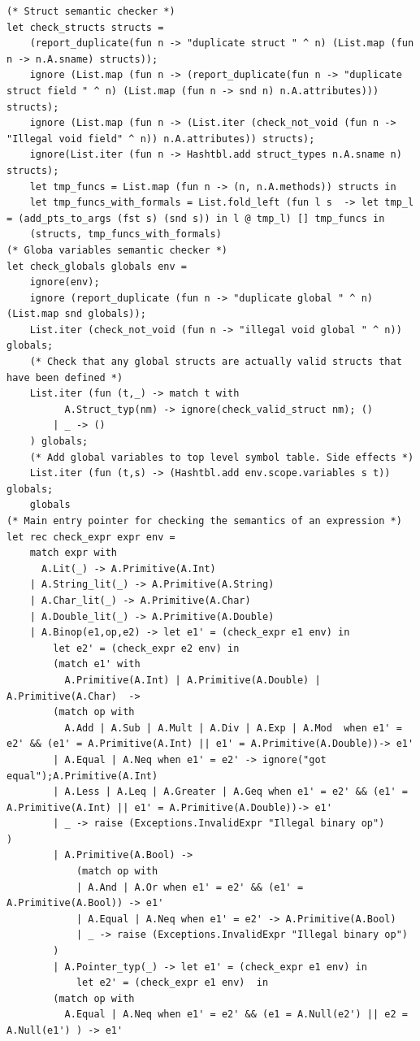 \documentclass{article}
\begin{document}
\begin{lstlisting}
(* Struct semantic checker *)
let check_structs structs = 
	(report_duplicate(fun n -> "duplicate struct " ^ n) (List.map (fun n -> n.A.sname) structs)); 
	ignore (List.map (fun n -> (report_duplicate(fun n -> "duplicate struct field " ^ n) (List.map (fun n -> snd n) n.A.attributes))) structs);
	ignore (List.map (fun n -> (List.iter (check_not_void (fun n -> "Illegal void field" ^ n)) n.A.attributes)) structs);
	ignore(List.iter (fun n -> Hashtbl.add struct_types n.A.sname n) structs);
	let tmp_funcs = List.map (fun n -> (n, n.A.methods)) structs in
	let tmp_funcs_with_formals = List.fold_left (fun l s  -> let tmp_l = (add_pts_to_args (fst s) (snd s)) in l @ tmp_l) [] tmp_funcs in
	(structs, tmp_funcs_with_formals)
(* Globa variables semantic checker *)
let check_globals globals env = 
	ignore(env);
	ignore (report_duplicate (fun n -> "duplicate global " ^ n) (List.map snd globals)); 
	List.iter (check_not_void (fun n -> "illegal void global " ^ n)) globals;
	(* Check that any global structs are actually valid structs that have been defined *)
	List.iter (fun (t,_) -> match t with 
		  A.Struct_typ(nm) -> ignore(check_valid_struct nm); ()
		| _ -> ()
	) globals;
	(* Add global variables to top level symbol table. Side effects *)
	List.iter (fun (t,s) -> (Hashtbl.add env.scope.variables s t)) globals;
	globals
(* Main entry pointer for checking the semantics of an expression *)
let rec check_expr expr env =
	match expr with
	  A.Lit(_) -> A.Primitive(A.Int)
	| A.String_lit(_) -> A.Primitive(A.String)
	| A.Char_lit(_) -> A.Primitive(A.Char)
	| A.Double_lit(_) -> A.Primitive(A.Double)
	| A.Binop(e1,op,e2) -> let e1' = (check_expr e1 env) in 
		let e2' = (check_expr e2 env) in
		(match e1' with 
		  A.Primitive(A.Int) | A.Primitive(A.Double) | A.Primitive(A.Char)  -> 
		(match op with
		  A.Add | A.Sub | A.Mult | A.Div | A.Exp | A.Mod  when e1' = e2' && (e1' = A.Primitive(A.Int) || e1' = A.Primitive(A.Double))-> e1'
		| A.Equal | A.Neq when e1' = e2' -> ignore("got equal");A.Primitive(A.Int)
		| A.Less | A.Leq | A.Greater | A.Geq when e1' = e2' && (e1' = A.Primitive(A.Int) || e1' = A.Primitive(A.Double))-> e1'
		| _ -> raise (Exceptions.InvalidExpr "Illegal binary op") 
) 
		| A.Primitive(A.Bool) -> 		
			(match op with
			| A.And | A.Or when e1' = e2' && (e1' = A.Primitive(A.Bool)) -> e1'
			| A.Equal | A.Neq when e1' = e2' -> A.Primitive(A.Bool)
			| _ -> raise (Exceptions.InvalidExpr "Illegal binary op") 
		) 
		| A.Pointer_typ(_) -> let e1' = (check_expr e1 env) in 
			let e2' = (check_expr e1 env)  in  
		(match op with
		  A.Equal | A.Neq when e1' = e2' && (e1 = A.Null(e2') || e2 = A.Null(e1') ) -> e1'

\end{lstlisting}
\end{document}
